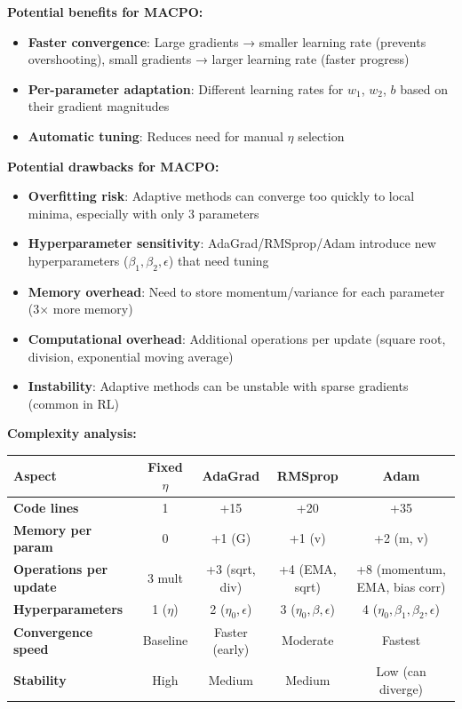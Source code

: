 \documentclass[11pt,a4paper]{article}
\begin{document}
\begin{itemize}
\textbf{Potential benefits for MACPO:}
\begin{itemize}
    \item \textbf{Faster convergence}: Large gradients → smaller learning rate (prevents overshooting), small gradients → larger learning rate (faster progress)
    \item \textbf{Per-parameter adaptation}: Different learning rates for $w_1$, $w_2$, $b$ based on their gradient magnitudes
    \item \textbf{Automatic tuning}: Reduces need for manual $\eta$ selection
\end{itemize}

\textbf{Potential drawbacks for MACPO:}
\begin{itemize}
    \item \textbf{Overfitting risk}: Adaptive methods can converge too quickly to local minima, especially with only 3 parameters
    \item \textbf{Hyperparameter sensitivity}: AdaGrad/RMSprop/Adam introduce new hyperparameters ($\beta_1, \beta_2, \epsilon$) that need tuning
    \item \textbf{Memory overhead}: Need to store momentum/variance for each parameter (3× more memory)
    \item \textbf{Computational overhead}: Additional operations per update (square root, division, exponential moving average)
    \item \textbf{Instability}: Adaptive methods can be unstable with sparse gradients (common in RL)
\end{itemize}

\textbf{Complexity analysis:}

\begin{center}
\begin{tabular}{|l|c|c|c|c|}
\hline
\textbf{Aspect} & \textbf{Fixed $\eta$} & \textbf{AdaGrad} & \textbf{RMSprop} & \textbf{Adam} \\
\hline
\textbf{Code lines} & 1 & +15 & +20 & +35 \\
\hline
\textbf{Memory per param} & 0 & +1 (G) & +1 (v) & +2 (m, v) \\
\hline
\textbf{Operations per update} & 3 mult & +3 (sqrt, div) & +4 (EMA, sqrt) & +8 (momentum, EMA, bias corr) \\
\hline
\textbf{Hyperparameters} & 1 ($\eta$) & 2 ($\eta_0, \epsilon$) & 3 ($\eta_0, \beta, \epsilon$) & 4 ($\eta_0, \beta_1, \beta_2, \epsilon$) \\
\hline
\textbf{Convergence speed} & Baseline & Faster (early) & Moderate & Fastest \\
\hline
\textbf{Stability} & High & Medium & Medium & Low (can diverge) \\
\hline
\end{tabular}
\end{center}


\end{itemize}
\end{document}
